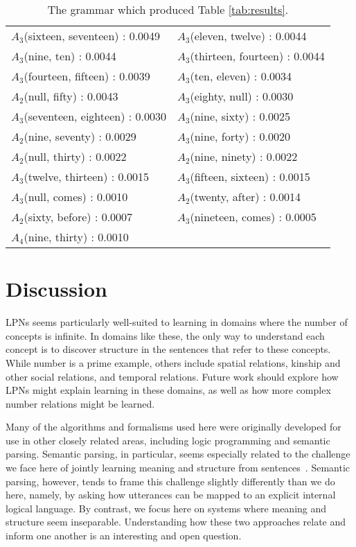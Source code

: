 \documentclass[10pt, twocolumn]{article}
\begin{document}
\begin{table}[t]
\begin{tabular}{>{\tiny} l >{\tiny} l}
$A_3$(sixteen, seventeen) : 0.0049 &
$A_3$(eleven, twelve) : 0.0044 \\
$A_3$(nine, ten) : 0.0044 &
$A_3$(thirteen, fourteen) : 0.0044 \\
$A_3$(fourteen, fifteen) : 0.0039 &
$A_3$(ten, eleven) : 0.0034 \\
$A_2$(null, fifty) : 0.0043 &
$A_3$(eighty, null) : 0.0030 \\
$A_3$(seventeen, eighteen) : 0.0030 &
$A_3$(nine, sixty) : 0.0025 \\
$A_2$(nine, seventy) : 0.0029 &
$A_3$(nine, forty) : 0.0020 \\
$A_2$(null, thirty) : 0.0022 &
$A_2$(nine, ninety) : 0.0022 \\
$A_3$(twelve, thirteen) : 0.0015 &
$A_3$(fifteen, sixteen) : 0.0015 \\
$A_3$(null, comes) : 0.0010 &
$A_2$(twenty, after) : 0.0014 \\
$A_2$(sixty, before) : 0.0007 &
$A_3$(nineteen, comes) : 0.0005 \\
$A_4$(nine, thirty) : 0.0010 & \\
\end{tabular}
\caption{The grammar which produced Table \ref{tab:results}.}
\label{tab:grammar}
\end{table}

\section{Discussion}

LPNs seems particularly well-suited to learning in domains where the
number of concepts is infinite. In domains like these, the only way to
understand each concept is to discover structure in the sentences that
refer to these concepts. While number is a prime example, others
include spatial relations, kinship and other social relations, and
temporal relations. Future work should explore how LPNs might explain
learning in these domains, as well as how more complex number
relations might be learned.

Many of the algorithms and formalisms used here were originally
developed for use in other closely related areas, including logic
programming and semantic parsing. Semantic parsing, in particular,
seems especially related to the challenge we face here of jointly
learning meaning and structure from
sentences~\cite{berant2013semantic, liang2013learning,
  kwiatkowski2010inducing}. Semantic parsing, however, tends to frame
this challenge slightly differently than we do here, namely, by asking
how utterances can be mapped to an explicit internal logical
language. By contrast, we focus here on systems where meaning and
structure seem inseparable. Understanding how these two approaches
relate and inform one another is an interesting and open question.
\end{document}
